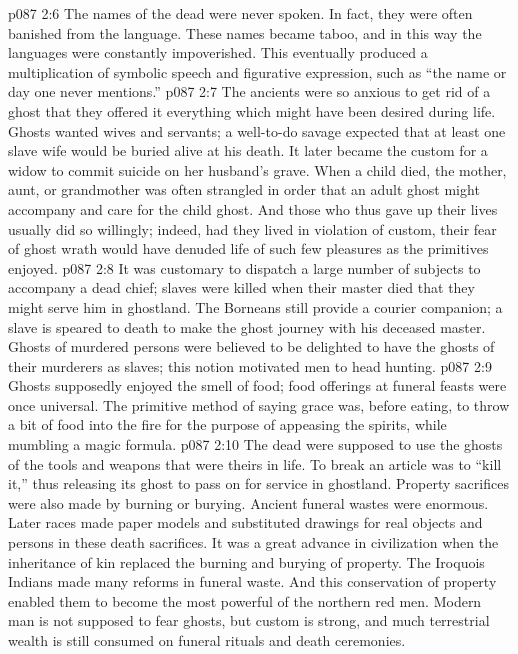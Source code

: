 \vs p087 2:6 The names of the dead were never spoken. In fact, they were often banished from the language. These names became taboo, and in this way the languages were constantly impoverished. This eventually produced a multiplication of symbolic speech and figurative expression, such as “the name or day one never mentions.”
\pc \vs p087 2:7 The ancients were so anxious to get rid of a ghost that they offered it everything which might have been desired during life. Ghosts wanted wives and servants; a well\hyp{}to\hyp{}do savage expected that at least one slave wife would be buried alive at his death. It later became the custom for a widow to commit suicide on her husband’s grave. When a child died, the mother, aunt, or grandmother was often strangled in order that an adult ghost might accompany and care for the child ghost. And those who thus gave up their lives usually did so willingly; indeed, had they lived in violation of custom, their fear of ghost wrath would have denuded life of such few pleasures as the primitives enjoyed.
\vs p087 2:8 It was customary to dispatch a large number of subjects to accompany a dead chief; slaves were killed when their master died that they might serve him in ghostland. The Borneans still provide a courier companion; a slave is speared to death to make the ghost journey with his deceased master. Ghosts of murdered persons were believed to be delighted to have the ghosts of their murderers as slaves; this notion motivated men to head hunting.
\vs p087 2:9 Ghosts supposedly enjoyed the smell of food; food offerings at funeral feasts were once universal. The primitive method of saying grace was, before eating, to throw a bit of food into the fire for the purpose of appeasing the spirits, while mumbling a magic formula.\plusone
\vs p087 2:10 The dead were supposed to use the ghosts of the tools and weapons that were theirs in life. To break an article was to “kill it,” thus releasing its ghost to pass on for service in ghostland. Property sacrifices were also made by burning or burying. Ancient funeral wastes were enormous. Later races made paper models and substituted drawings for real objects and persons in these death sacrifices. It was a great advance in civilization when the inheritance of kin replaced the burning and burying of property. The Iroquois Indians made many reforms in funeral waste. And this conservation of property enabled them to become the most powerful of the northern red men. Modern man is not supposed to fear ghosts, but custom is strong, and much terrestrial wealth is still consumed on funeral rituals and death ceremonies.
